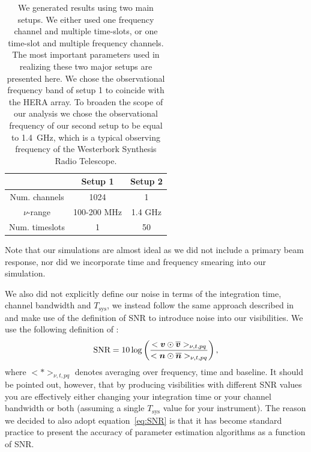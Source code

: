 \documentclass[useAMS,usenatbib]{mn2e}
\newcommand{\bz}{\bmath{z}}
\newcommand{\bv}{\bmath{v}}
\newcommand{\bn}{\bmath{n}}
\newcommand{\bone}{\bmath{1}}
\newcommand{\conj}[1]{\overline{#1}}
\begin{document}
\begin{table}
\centering
\caption{We generated results using two main setups. We either used one frequency channel and multiple time-slots, or one time-slot and multiple frequency channels. The most important parameters used in realizing these two major setups are presented here. %
We chose the observational frequency band of setup 1 to coincide with the HERA array. To broaden the scope of our 
analysis we chose the observational frequency of our second setup to be equal to 1.4~GHz, which is a typical observing frequency of the Westerbork Synthesis Radio Telescope.}
\begin{tabular}{|c c c|} 
\hline
 & Setup 1 & Setup 2\\
\hline
\hline
 Num. channels & 1024 & 1\\
$\nu$-range & 100-200 MHz & 1.4 GHz\\
Num. timeslots & 1 & 50\\
\hline
\end{tabular}
\label{tab:ch_parm}
\end{table}

Note that our simulations are almost ideal as we did not include a primary beam response, nor did we incorporate time and frequency smearing into our simulation.

We also did not explicitly define our noise in terms of the integration time, channel bandwidth and $T_{\textrm{sys}}$, we instead
follow the same approach described in \citep{Liu2010,Marthi2014} and make use of the definition of SNR to introduce noise into our visibilities. 
We use the following definition of 
\citep[SNR, ][]{Liu2010,Marthi2014}:  
\begin{equation}
\label{eq:SNR}
\textrm{SNR} = 10\log \left (\frac{<\bv\odot\conj{\bv}>_{\nu,t,pq}}{<\bn\odot\conj{\bn}>_{\nu,t,pq}} \right ), 
\end{equation}
where $<*>_{\nu,t,pq}$ denotes averaging over frequency, time and baseline. It should be pointed out, however, that by producing visibilities with different SNR values you are 
effectively either changing your integration time or your channel bandwidth or both (assuming a single $T_{\textrm{sys}}$ value for your instrument). The reason we decided to also adopt
equation~\ref{eq:SNR} is that it has become standard practice to present the accuracy of parameter estimation algorithms as a function of SNR.
\end{document}
